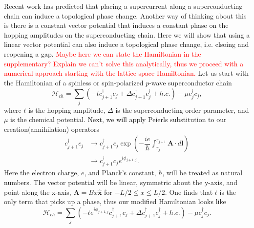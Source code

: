 \documentclass[aps,prb,showpacs,twocolumn,amsmath,amssymb,superscriptaddress]{revtex4-2}
\newcommand{\Red}[1]{\textcolor{red}{#1}}
\let\oldhat\hat
\renewcommand{\hat}[1]{\oldhat{\mathbf{#1}}}
\renewcommand{\vec}[1]{\mathbf{#1}}
\newcommand{\Ham}{\mathcal{H}}
\newcommand{\cc}{c^{\dagger}}
\newcommand{\de}{\Delta}
\begin{document}
Recent work has predicted that placing a supercurrent along a superconducting chain can induce a topological phase change.
Another way of thinking about this is there is a constant vector potential that induces a constant phase on the hopping amplitudes on the superconducting chain.
Here we will show that using a linear vector potential can also induce a topological phase change, i.e. clsoing and reopening a gap.
\Red{Maybe here we can state the Hamiltonian in the supplementary? Explain we can't solve this analytically, thus we proceed with a numerical approach starting with the lattice space Hamiltonian.}
Let us start with the Hamiltonian of a spinless or spin-polarized $p$-wave superconductor chain
\begin{equation}
  \Ham_{ch} = \sum_j (-t\cc_{j+1} c_j + \de \cc_{j+1}\cc_j + h.c.) - \mu \cc_j c_j,
\end{equation}
where $t$ is the hopping amplitude, $\de$ is the superconducting order parameter, and $\mu$ is the chemical potential.
Next, we will apply Peierls substitution to our creation(annihilation) operators
\begin{align}
  \cc_{j+1} c_j &\rightarrow \cc_{j+1} c_j \exp \left(-\dfrac{i e}{\hbar} \int_{r_j}^{r_{j+1}} \vec{A} \cdot d\vec{l} \right) \\ \nonumber
  &\rightarrow \cc_{j+1} c_j e^{i \phi_{j+1,j}}.
\end{align}
Here the electron charge, $e$, and Planck's constant, $\hbar$, will be treated as natural numbers. The vector potential will be linear, symmetric about the y-axis, and point along the x-axis, $\vec{A} = Bx\hat{x}$ for $-L/2 \leq x \leq L/2$.
One finds that $t$ is the only term that picks up a phase, thus our modified Hamiltonian looks like
\begin{equation} \label{eq: Peierls chain}
  \Ham_{ch} = \sum_j (-t e^{i\phi_{j+1,j}} \cc_{j+1} c_j + \de \cc_{j+1}\cc_j + h.c.) - \mu \cc_j c_j.
\end{equation}
\end{document}
